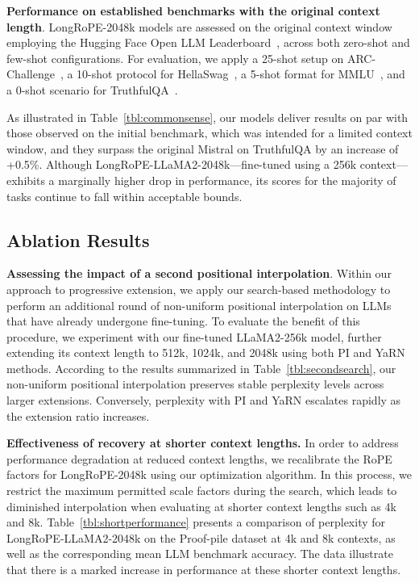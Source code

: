 \textbf{Performance on established benchmarks with the original context length}. LongRoPE-2048k models are assessed on the original context window employing the Hugging Face Open LLM Leaderboard~\cite{huggingfaceboard}, across both zero-shot and few-shot configurations. For evaluation, we apply a 25-shot setup on ARC-Challenge~\cite{allenai:arc}, a 10-shot protocol for HellaSwag~\cite{zellers2019hellaswag}, a 5-shot format for MMLU~\cite{mmlu}, and a 0-shot scenario for TruthfulQA~\cite{lin2021truthfulqa}.

As illustrated in Table~\ref{tbl:commonsense}, our models deliver results on par with those observed on the initial benchmark, which was intended for a limited context window, and they surpass the original Mistral on TruthfulQA by an increase of +0.5\%. Although LongRoPE-LLaMA2-2048k—fine-tuned using a 256k context—exhibits a marginally higher drop in performance, its scores for the majority of tasks continue to fall within acceptable bounds.

\subsection{Ablation Results}

\textbf{Assessing the impact of a second positional interpolation}. Within our approach to progressive extension, we apply our search-based methodology to perform an additional round of non-uniform positional interpolation on LLMs that have already undergone fine-tuning. To evaluate the benefit of this procedure, we experiment with our fine-tuned LLaMA2-256k model, further extending its context length to 512k, 1024k, and 2048k using both PI and YaRN methods. According to the results summarized in Table~\ref{tbl:secondsearch}, our non-uniform positional interpolation preserves stable perplexity levels across larger extensions. Conversely, perplexity with PI and YaRN escalates rapidly as the extension ratio increases.

\textbf{Effectiveness of recovery at shorter context lengths.} In order to address performance degradation at reduced context lengths, we recalibrate the RoPE factors for LongRoPE-2048k using our optimization algorithm. In this process, we restrict the maximum permitted scale factors during the search, which leads to diminished interpolation when evaluating at shorter context lengths such as 4k and 8k. Table~\ref{tbl:shortperformance} presents a comparison of perplexity for LongRoPE-LLaMA2-2048k on the Proof-pile dataset at 4k and 8k contexts, as well as the corresponding mean LLM benchmark accuracy. The data illustrate that there is a marked increase in performance at these shorter context lengths.

